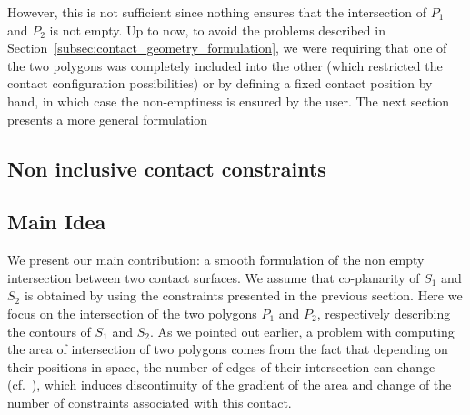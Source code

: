 However, this is not sufficient since nothing ensures that the intersection of $P_1$ and $P_2$ is not empty.
Up to now, to avoid the problems described in Section~\ref{subsec:contact_geometry_formulation}, we were requiring that one of the two polygons was completely included into the other (which restricted the contact configuration possibilities) or by defining a fixed contact position by hand, in which case the non-emptiness is ensured by the user.
The next section presents a more general formulation

\subsection{Non inclusive contact constraints}
\label{subsec:ellipse}
\subsection{Main Idea}
\label{subsec:idea}
We present our main contribution: a smooth formulation of the non empty intersection between two contact surfaces.
We assume that co-planarity of $S_1$ and $S_2$ is obtained by using the constraints presented in the previous section.
Here we focus on the intersection of the two polygons $P_1$ and $P_2$, respectively describing the contours of $S_1$ and $S_2$.
As we pointed out earlier, a problem with computing the area of intersection of two polygons comes from the fact that depending on their positions in space, the number of edges of their intersection can change (cf.~), which induces discontinuity of the gradient of the area and change of the number of constraints associated with this contact.

